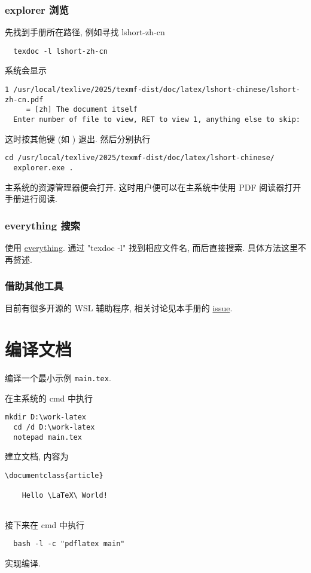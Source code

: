 \subsubsection{explorer 浏览}

先找到手册所在路径,
例如寻找 \textsf{lshort-zh-cn}
\begin{lstlisting}
  texdoc -l lshort-zh-cn
\end{lstlisting}
系统会显示
\begin{lstlisting}[language = {}]
   1 /usr/local/texlive/2025/texmf-dist/doc/latex/lshort-chinese/lshort-zh-cn.pdf
     = [zh] The document itself
  Enter number of file to view, RET to view 1, anything else to skip:
\end{lstlisting}
这时按其他键 (如 ) 退出.
然后分别执行
\begin{lstlisting}[language = {}]
  cd /usr/local/texlive/2025/texmf-dist/doc/latex/lshort-chinese/
  explorer.exe .
\end{lstlisting}
主系统的资源管理器便会打开.
这时用户便可以在主系统中使用 PDF 阅读器打开手册进行阅读.

\subsubsection{everything 搜索}

使用 \href{https://www.voidtools.com/zh-cn/}{everything}.
通过 "texdoc -l" 找到相应文件名,
而后直接搜索.
具体方法这里不再赘述.

\subsubsection{借助其他工具}

目前有很多开源的 WSL 辅助程序,
相关讨论见本手册的 \href{https://github.com/OsbertWang/install-latex-guide-zh-cn/issues/13}{issue}.

\section{编译文档}

编译一个最小示例 \texttt{main.tex}.

在主系统的 \textsf{cmd} 中执行
\begin{lstlisting}[deletekeywords = tex]
  mkdir D:\work-latex
  cd /d D:\work-latex
  notepad main.tex
\end{lstlisting}
建立文档,
内容为
\begin{lstlisting}[language = mwe]
  \documentclass{article}
  
    Hello \LaTeX\ World!
  
\end{lstlisting}
接下来在 \textsf{cmd} 中执行
\begin{lstlisting}
  bash -l -c "pdflatex main"
\end{lstlisting}
实现编译.

